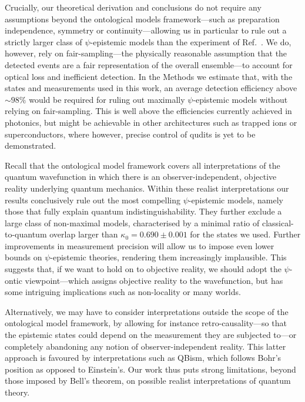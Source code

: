 \documentclass[aps,prl,floatfix,twocolumn,tightenlines,amsmath,amssymb,nofootinbib]{revtex4-1}
\begin{document}
Crucially, our theoretical derivation and conclusions do not require any assumptions beyond the ontological models framework---such as preparation independence\cite{Pusey2012,Nigg2012}, symmetry\cite{Aaronson2013} or continuity\cite{hardy2013are,Patra2013no-,Patra2013}---allowing us in particular to rule out a strictly larger class of $\psi$-epistemic models than the experiment of Ref.~\cite{Nigg2012}.
We do, however, rely on fair-sampling\cite{larsson2014loopholes,RevModPhys.86.419}---the physically reasonable assumption that the detected events are a fair representation of the overall ensemble---to account for optical loss and inefficient detection.
In the Methods we estimate that, with the states and measurements used in this work, an average detection efficiency above $\sim 98 \%$ would be required for ruling out maximally $\psi$-epistemic models without relying on fair-sampling. This is well above the efficiencies currently achieved in photonics, but might be achievable in other architectures such as trapped ions or superconductors, where however, precise control of qudits is yet to be demonstrated.

Recall that the ontological model framework covers all interpretations of the quantum wavefunction in which there is an observer-independent, objective reality underlying quantum mechanics. Within these realist interpretations our results conclusively rule out the most compelling $\psi$-epistemic models, namely those that fully explain quantum indistinguishability. 
They further exclude a large class of non-maximal models, characterised by a minimal ratio of classical-to-quantum overlap larger than $\kappa_0{=}0.690\pm 0.001$ 
for the states we used. Further improvements in measurement precision will allow us to impose even lower bounds on $\psi$-epistemic theories, rendering them increasingly implausible. This suggests that, if we want to hold on to objective reality, we should adopt the $\psi$-ontic viewpoint---which assigns objective reality to the wavefunction, but has some intriguing implications such as non-locality or many worlds\cite{everett1957relative}.

Alternatively, we may have to consider interpretations outside the scope of the ontological model framework, by allowing for instance retro-causality---so that the epistemic states could depend on the measurement they are subjected to---or completely abandoning any notion of observer-independent reality. This latter approach is favoured by interpretations such as QBism\cite{caves2002quantum,Fuchs2010,mermin2000QBism}, which follows Bohr's position as opposed to Einstein's.
Our work thus puts strong limitations, beyond those imposed by Bell's theorem, on possible realist interpretations of quantum theory.
\end{document}
